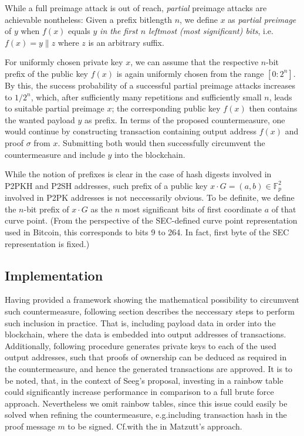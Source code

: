 \documentclass[10pt,a4paper,twocolumn]{article}
\begin{document}
While a full preimage attack is out of reach, \emph{partial} preimage attacks are achievable nontheless:
Given a prefix bitlength $n$, we define $x$ as \emph{partial preimage} of $y$ when $f(x)$ equals $y$ \emph{in the first $n$ leftmost (most significant) bits}, i.e.\@ $f(x)=y\|z$ where $z$ is an arbitrary suffix.

For uniformly chosen private key $x$, we can assume that the respective $n$-bit prefix of the public key $f(x)$ is again uniformly chosen from the range $[0{:}2^n]$.
By this, the success probability of a successful partial preimage attacks increases to $1/2^n$, which, after sufficiently many repetitions and sufficiently small $n$, leads to suitable partial preimage $x$; the corresponding public key $f(x)$ then contains the wanted payload $y$ as prefix.
In terms of the proposed countermeasure, one would continue by constructing transaction containing output address $f(x)$ and proof $\sigma$ from $x$.
Submitting both would then successfully circumvent the countermeasure and include $y$ into the blockchain.

While the notion of prefixes is clear in the case of hash digests involved in P2PKH and P2SH addresses, such prefix of a public key $x\cdot G = (a,b) \in \mathbb{F}_p^2$ involved in P2PK addresses is not neccessarily obvious.
To be definite, we define the $n$-bit prefix of $x\cdot G$ as the $n$ most significant bits of first coordinate $a$ of that curve point. 
(From the perspective of the SEC-defined curve point representation used in Bitcoin, this corresponds to bits 9 to 264. In fact, first byte of the SEC representation is fixed.)


\subsection{Implementation}

Having provided a framework showing the mathematical possibility to circumvent such countermeasure, following section describes the neccessary steps to perform such inclusion in practice.
That is, including payload data in order into the blockchain, where the data is embedded into output addresses of transactions.
Additionally, following procedure generates private keys to each of the used output addresses, such that proofs of ownership can be deduced as required in the countermeasure, and hence the generated transactions are approved.
It is to be noted, that, in the context of Seeg's proposal, investing in a rainbow table could significantly increase performance in comparison to a full brute force approach.
Nevertheless we omit rainbow tables, since this issue could easily be solved when refining the countermeasure, e.g.\@ including transaction hash in the proof message $m$ to be signed.
Cf.\@ with the  in Matzutt's approach.
\end{document}
